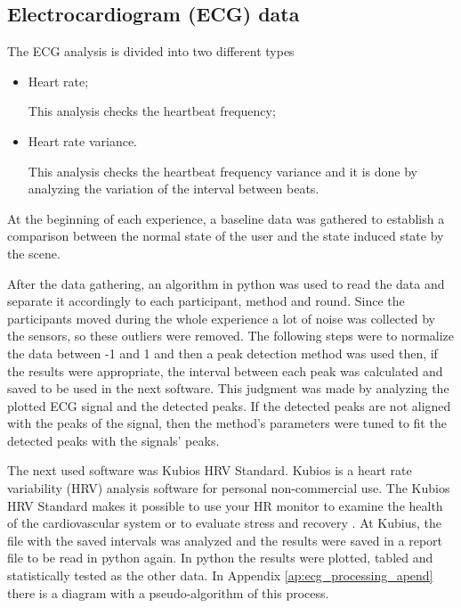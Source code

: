 \subsection{Electrocardiogram (ECG) data}
\label{subsec:results_ecg}

The ECG analysis is divided into two different types

\begin{itemize}
    \item Heart rate;
    
        This analysis checks the heartbeat frequency;

    \item Heart rate variance.
    
        This analysis checks the heartbeat frequency variance and it is done by analyzing the variation of the interval between beats.

\end{itemize}

At the beginning of each experience, a baseline data was gathered to establish a comparison between the normal state of the user and the state induced state by the scene.

After the data gathering, an algorithm in python was used to read the data and separate it accordingly to each participant, method and round. Since the participants moved during the whole experience a lot of noise was collected by the sensors, so these outliers were removed. The following steps were to normalize the data between -1 and 1 and then a peak detection method was used then, if the results were appropriate, the interval between each peak was calculated and saved to be used in the next software. This judgment was made by analyzing the plotted ECG signal and the detected peaks. If the detected peaks are not aligned with the peaks of the signal, then the method's parameters were tuned to fit the detected peaks with the signals' peaks.

The next used software was Kubios HRV Standard. Kubios is a heart rate variability (HRV) analysis software for personal non-commercial use. The Kubios HRV Standard makes it possible to use your HR monitor to examine the health of the cardiovascular system or to evaluate stress and recovery \cite{kubios}. At Kubius, the file with the saved intervals was analyzed and the results were saved in a report file to be read in python again. In python the results were plotted, tabled and statistically tested as the other data. In Appendix \ref{ap:ecg_processing_apend} there is a diagram with a pseudo-algorithm of this process.

